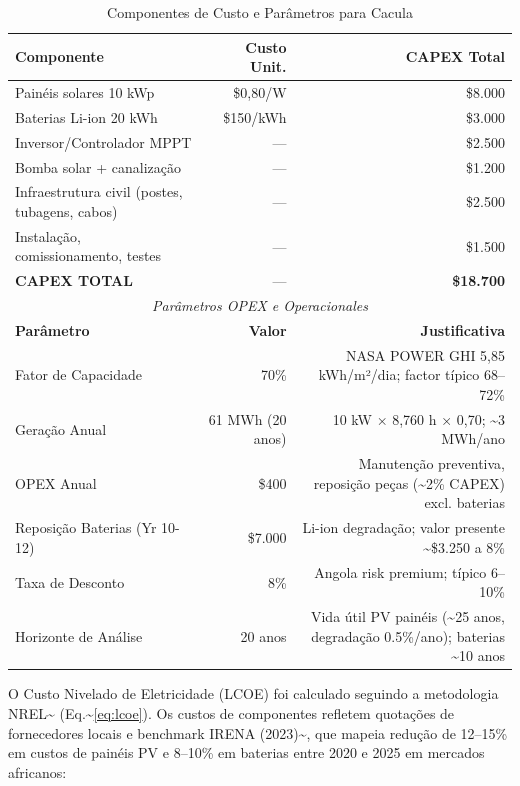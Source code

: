\documentclass[12pt, a4paper]{article}
\begin{document}
\begin{table}[H]
\centering
\caption{Componentes de Custo e Parâmetros para Cacula}
\label{Tab:3}
\small
\begin{tabular}{lrr}
\toprule
\rowcolor{LightBlue}\textbf{Componente} & \textbf{Custo Unit.} & \textbf{CAPEX Total} \\
\midrule
Painéis solares 10 kWp & \$0,80/W & \$8.000 \\
Baterias Li-ion 20 kWh & \$150/kWh & \$3.000 \\
Inversor/Controlador MPPT & --- & \$2.500 \\
Bomba solar + canalização & --- & \$1.200 \\
Infraestrutura civil (postes, tubagens, cabos) & --- & \$2.500 \\
Instalação, comissionamento, testes & --- & \$1.500 \\
\midrule
\textbf{CAPEX TOTAL} & --- & \textbf{\$18.700} \\
\midrule
\multicolumn{3}{c}{\textit{Parâmetros OPEX e Operacionales}} \\
\midrule
\textbf{Parâmetro} & \textbf{Valor} & \textbf{Justificativa} \\
\midrule
Fator de Capacidade & 70\% & NASA POWER GHI 5,85 kWh/m²/dia; factor típico 68–72\% \\
Geração Anual & 61 MWh (20 anos) & 10 kW × 8,760 h × 0,70; \textasciitilde{}3 MWh/ano \\
OPEX Anual & \$400 & Manutenção preventiva, reposição peças (\textasciitilde{}2\% CAPEX) excl. baterias \\
Reposição Baterias (Yr 10-12) & \$7.000 & Li-ion degradação; valor presente \textasciitilde{}\$3.250 a 8\% \\
Taxa de Desconto & 8\% & Angola risk premium; típico 6–10\% \\
Horizonte de Análise & 20 anos & Vida útil PV painéis (\textasciitilde{}25 anos, degradação 0.5\%/ano); baterias \textasciitilde{}10 anos \\
\bottomrule
\end{tabular}
\end{table}

O Custo Nivelado de Eletricidade (LCOE) foi calculado seguindo a metodologia NREL\textasciitilde{}\citep{NREL2020} (Eq.\textasciitilde{}\ref{eq:lcoe}). Os custos de componentes refletem quotações de fornecedores locais e benchmark IRENA (2023)\textasciitilde{}\citep{IRENA2023}, que mapeia redução de 12--15\% em custos de painéis PV e 8--10\% em baterias entre 2020 e 2025 em mercados africanos:
\end{document}

